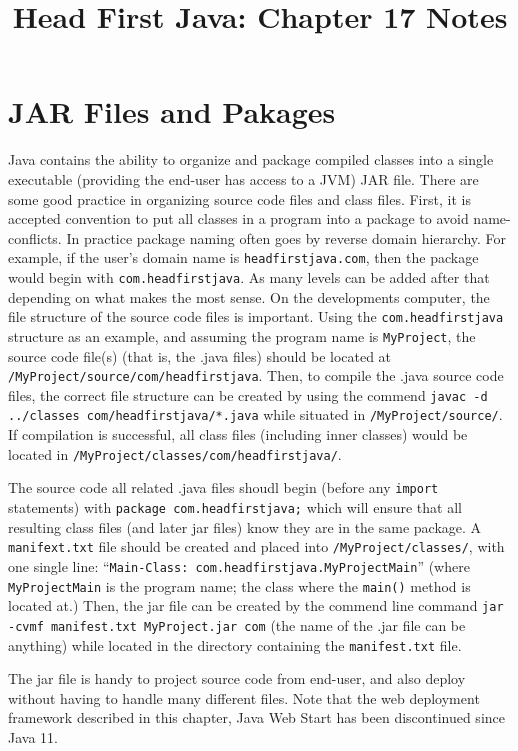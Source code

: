 \documentclass{tufte-handout}
\title{Head First Java: Chapter 17 Notes}
\begin{document}
    \maketitle

    \section*{JAR Files and Pakages}
    Java contains the ability to organize and package compiled classes into a single executable (providing the end-user has access to a JVM) JAR file. There are some good practice in organizing source code files and class files. First, it is accepted convention to put all classes in a program into a package to avoid name-conflicts. In practice package naming often goes by reverse domain hierarchy. For example, if the user's domain name is \texttt{headfirstjava.com}, then the package would begin with \texttt{com.headfirstjava}. As many levels can be added after that depending on what makes the most sense. On the developments computer, the file structure of the source code files is important. Using the \texttt{com.headfirstjava} structure as an example, and assuming the program name is \texttt{MyProject}, the source code file(s) (that is, the .java files) should be located at \texttt{/MyProject/source/com/headfirstjava}. Then, to compile the .java source code files, the correct file structure can be created by using the commend \texttt{javac -d ../classes com/headfirstjava/*.java} while situated in \texttt{/MyProject/source/}. If compilation is successful, all class files (including inner classes) would be located in \texttt{/MyProject/classes/com/headfirstjava/}.

    The source code all related .java files shoudl begin (before any \texttt{import} statements) with \texttt{package com.headfirstjava;} which will ensure that all resulting class files (and later jar files) know they are in the same package. A \texttt{manifext.txt} file should be created and placed into \texttt{/MyProject/classes/}, with one single line: ``\texttt{Main-Class: com.headfirstjava.MyProjectMain}'' (where \texttt{MyProjectMain} is the program name; the class where the \texttt{main()} method is located at.) Then, the jar file can be created by the commend line command \texttt{jar -cvmf manifest.txt MyProject.jar com} (the name of the .jar file can be anything) while located in the directory containing the \texttt{manifest.txt} file. 

    The jar file is handy to project source code from end-user, and also deploy without having to handle many different files. Note that the web deployment framework described in this chapter, Java Web Start has been discontinued since Java 11.
\end{document}
